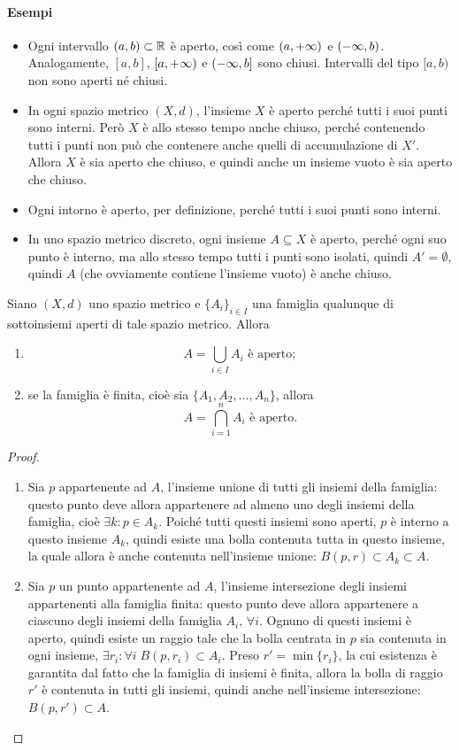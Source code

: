 \paragraph{Esempi}
\begin{itemize}
\item Ogni intervallo $(a,b)\subset\mathbb{R}$ è aperto, così come $(a,+\infty)$ e $(-\infty,b)$. Analogamente, $[a,b]$, $[a,+\infty)$ e $(-\infty,b]$ sono chiusi. Intervalli del tipo $[a,b)$ non sono aperti né chiusi.
\item In ogni spazio metrico $(X,d)$, l'insieme $X$ è aperto perché tutti i suoi punti sono interni. Però $X$ è allo stesso tempo anche chiuso, perché contenendo tutti i punti non può che contenere anche quelli di accumulazione di $X'$. Allora $X$ è sia aperto che chiuso, e quindi anche un insieme vuoto è sia aperto che chiuso. 
\item Ogni intorno è aperto, per definizione, perché tutti i suoi punti sono interni.
\item In uno spazio metrico discreto, ogni insieme $A\subseteq X$ è aperto, perché ogni suo punto è interno, ma allo stesso tempo tutti i punti sono isolati, quindi $A'=\emptyset$, quindi $A$ (che ovviamente contiene l'insieme vuoto) è anche chiuso.
\end{itemize}
\begin{teorema} \label{t:unione-intersezione-aperti}
Siano $(X,d)$ uno spazio metrico e $\{A_i\}_{i\in I}$ una famiglia qualunque di sottoinsiemi aperti di tale spazio metrico. Allora
\begin{enumerate}
\item\[
A=\bigcup_{i\in I} A_i\text{ è aperto};
\]
\item se la famiglia è finita, cioè sia $\{A_1,A_2,\dots,A_n\}$, allora
\[
A=\bigcap_{i=1}^n A_i\text{ è aperto}.
\]
\end{enumerate}
\end{teorema}
\begin{proof}
\begin{enumerate}
\item Sia $p$ appartenente ad $A$, l'insieme unione di tutti gli insiemi della famiglia: questo punto deve allora appartenere ad almeno uno degli insiemi della famiglia, cioè $\exists k\colon p\in A_k$. Poiché tutti questi insiemi sono aperti, $p$ è interno a questo insieme $A_k$, quindi esiste una bolla contenuta tutta in questo insieme, la quale allora è anche contenuta nell'insieme unione: $B(p,r)\subset A_k\subset A$.
\item Sia $p$ un punto appartenente ad $A$, l'insieme intersezione degli insiemi appartenenti alla famiglia finita: questo punto deve allora appartenere a ciascuno degli insiemi della famiglia $A_i,\,\forall i$. Ognuno di questi insiemi è aperto, quindi esiste un raggio tale che la bolla centrata in $p$ sia contenuta in ogni insieme, $\exists r_i\colon \forall i\;B(p,r_i)\subset A_i$. Preso $r'=\min\{r_i\}$, la cui esistenza è garantita dal fatto che la famiglia di insiemi è finita, allora la bolla di raggio $r'$ è contenuta in tutti gli insiemi, quindi anche nell'insieme intersezione: $B(p,r')\subset A$.
\end{enumerate}
\end{proof}
